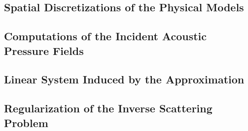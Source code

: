 \subsection{Spatial Discretizations of the Physical Models}


\subsection{Computations of the Incident Acoustic Pressure Fields}


\subsection{Linear System Induced by the  Approximation}


\subsection{Regularization of the Inverse Scattering Problem}
\label{subsec:recovery_regularization}

